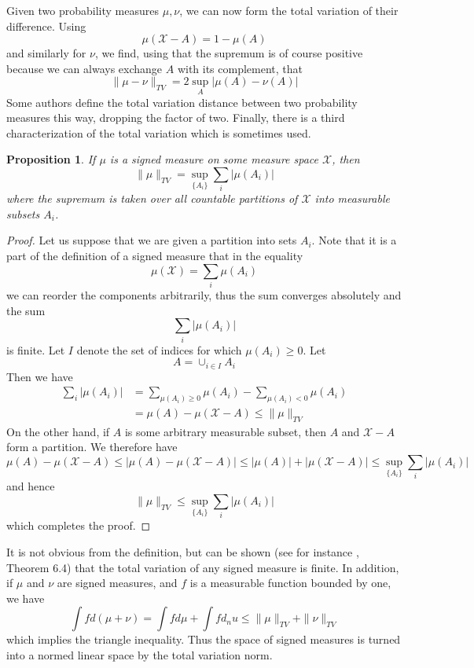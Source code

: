 \documentclass[a4paper, draft]{article}
\theoremstyle{own}
\newtheorem{prop}[thm]{Proposition}
\theoremstyle{remark}
\begin{document}
Given two probability measures $\mu, \nu$, we can now form the total variation of their difference. Using 
$$
\mu({\mathcal X} - A) = 1 - \mu(A)
$$
and similarly for $\nu$, we find, using that the supremum is of course positive because we can always exchange $A$ with its complement, that
$$
\| \mu - \nu \|_{TV} = 2 \sup_{A} |\mu(A) - \nu(A)|
$$
Some authors define the total variation distance between two probability measures this way, dropping the factor of two. Finally, there is a third characterization of the total variation which is sometimes used.

\begin{prop}
	If $\mu$ is a signed measure on some measure space ${\mathcal X}$, then
	$$
	\| \mu \|_{TV} = \sup_{\{A_i\}} \sum_i | \mu(A_i) |
	$$
	where the supremum is taken over all countable partitions of ${\mathcal X}$ into
	measurable subsets $A_i$.
\end{prop}

\begin{proof}
	Let us suppose that we are given a partition into sets $A_i$. Note that it is a part of
	the definition of a signed measure that in the equality
	$$
	\mu({\mathcal X}) = \sum_i \mu(A_i)
	$$
	we can reorder the components arbitrarily, thus the sum converges absolutely and the sum
	$$
	\sum_i |\mu(A_i)|
	$$
	is finite. Let $I$ denote the set of indices for which $\mu(A_i) \geq 0$. Let
	$$
	A = \cup_{i \in I} A_i
	$$
	Then we have
	\begin{align*}
	\sum_i |\mu(A_i)| &= \sum_{\mu(A_i) \geq 0} \mu(A_i) - \sum_{\mu(A_i) < 0} \mu(A_i) \\
	&= \mu(A) - \mu({\mathcal X} - A) \leq \| \mu \|_{TV}
	\end{align*}
	On the other hand, if $A$ is some arbitrary measurable subset, then $A$ and 
	${\mathcal X} - A$ form a partition. We therefore have
	$$
	\mu(A) - \mu({\mathcal X} - A) \leq |\mu(A) - \mu({\mathcal X} - A)|
	\leq |\mu(A)| +  |\mu({\mathcal X} - A)| 
	\leq \sup_{\{A_i\}} \sum_i | \mu(A_i) |
	$$
	and hence
	$$
	\| \mu \|_{TV} \leq \sup_{\{A_i\}} \sum_i | \mu(A_i) |
	$$
	which completes the proof.
\end{proof}

It is not obvious from the definition, but can be shown (see for instance \cite{Rudin}, Theorem 6.4) that the total variation of any signed measure is finite. In addition, if $\mu$ and $\nu$ are signed measures, and $f$ is a measurable function bounded by one, we have
$$
\int f d(\mu + \nu) = \int f d\mu + \int f d_nu \leq \| \mu \|_{TV} + \| \nu \|_{TV}
$$
which implies the triangle inequality. Thus the space of signed measures is turned into a normed linear space by the total variation norm.
\end{document}
